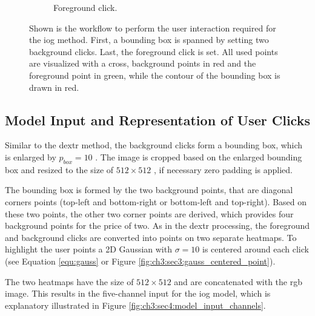 \begin{figure}
\begin{subfigure}[b]{0.3\textwidth}
		\caption{Foreground click.}
		\label{fig:ch3:sec4:iog_workflow_3}
	\end{subfigure}
	\caption[IOG User Interaction]{
		Shown is the workflow to perform the user interaction required for the \gls{iog} method.
		First, a bounding box is spanned by setting two background clicks.
		Last, the foreground click is set.
		All used points are visualized with a cross, background points in red and the foreground point in green, while the contour of the bounding box is drawn in red.
	} 
	\label{fig:ch3:sec4:iog_user_clicks}
\end{figure}

\subsection{Model Input and Representation of User Clicks}\label{ord:ch3:sec4:subsec2}

Similar to the \gls{dextr} method, the background clicks form a bounding box, which is enlarged by  $p_{{box}} = 10 $ .
The image is cropped based on the enlarged bounding box and resized to the size of $512 \times 512$ , if necessary zero padding is applied.

The bounding box is formed by the two background points, that are diagonal corners points (top-left and bottom-right or bottom-left and top-right).
Based on these two points, the other two corner points are derived, which provides four background points for the price of two.
As in the \gls{dextr} processing, the foreground and background clicks are converted into points on two separate heatmaps.
To highlight the user points a 2D Gaussian with $ \sigma = 10 $ is centered around each click (see Equation \ref{equ:gauss} or Figure \ref{fig:ch3:sec3:gauss_centered_point}).

The two heatmaps have the size of $512 \times 512$  and are concatenated with the \Gls{rgb} image.
This results in the five-channel input for the \gls{iog} model, which is explanatory illustrated in Figure \ref{fig:ch3:sec4:model_input_channels}.

